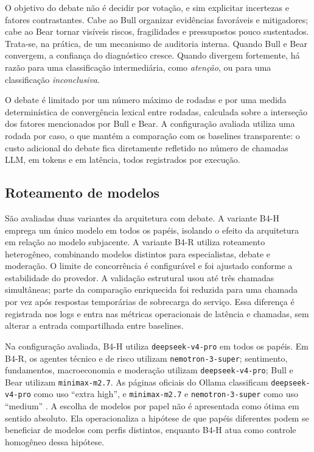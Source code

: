 O objetivo do debate não é decidir por votação, e sim explicitar
incertezas e fatores contrastantes. Cabe ao Bull organizar evidências
favoráveis e mitigadores; cabe ao Bear tornar visíveis riscos,
fragilidades e pressupostos pouco sustentados. Trata-se, na prática, de
um mecanismo de auditoria interna. Quando Bull e Bear convergem, a
confiança do diagnóstico cresce. Quando divergem fortemente, há razão
para uma classificação intermediária, como \textit{atenção}, ou para uma
classificação \textit{inconclusiva}.

O debate é limitado por um número máximo de rodadas e por uma medida
determinística de convergência lexical entre rodadas, calculada sobre a
interseção dos fatores mencionados por Bull e Bear. A configuração
avaliada utiliza uma rodada por caso, o que mantém a comparação com os
baselines transparente: o custo adicional do debate fica diretamente
refletido no número de chamadas LLM, em tokens e em latência, todos
registrados por execução.

\subsection{Roteamento de modelos}

São avaliadas duas variantes da arquitetura com debate. A variante B4-H
emprega um único modelo em todos os papéis, isolando o efeito da
arquitetura em relação ao modelo subjacente. A variante B4-R utiliza
roteamento heterogêneo, combinando modelos distintos para especialistas,
debate e moderação. O limite de concorrência é configurável e foi ajustado
conforme a estabilidade do provedor. A validação estrutural usou até três
chamadas simultâneas; parte da comparação enriquecida foi reduzida para uma
chamada por vez após respostas temporárias de sobrecarga do serviço. Essa
diferença é registrada nos logs e entra nas métricas operacionais de
latência e chamadas, sem alterar a entrada compartilhada entre baselines.

Na configuração avaliada, B4-H utiliza \texttt{deepseek-v4-pro} em todos
os papéis. Em B4-R, os agentes técnico e de risco utilizam
\texttt{nemotron-3-super}; sentimento, fundamentos, macroeconomia e
moderação utilizam \texttt{deepseek-v4-pro}; Bull e Bear utilizam
\texttt{minimax-m2.7}. As páginas oficiais do Ollama classificam
\texttt{deepseek-v4-pro} como uso ``extra high'', e
\texttt{minimax-m2.7} e \texttt{nemotron-3-super} como uso ``medium''
\citep{ollamadeepseek2026,ollamaminimax2026,ollamanemotron2026}. A escolha
de modelos por papel não é apresentada como ótima em sentido absoluto. Ela
operacionaliza a hipótese de que papéis diferentes podem se beneficiar de
modelos com perfis distintos, enquanto B4-H atua como controle homogêneo
dessa hipótese.


